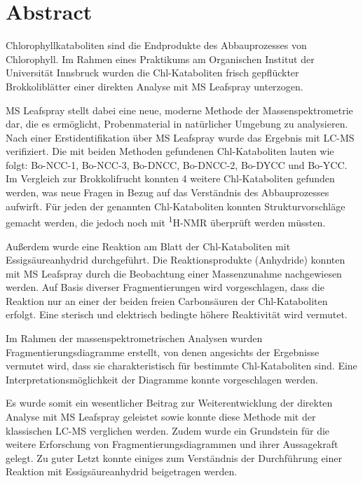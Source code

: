 

\chapter*{Abstract}
\label{cha:abstract}

Chlorophyllkataboliten sind die Endprodukte des Abbauprozesses von Chlorophyll. Im Rahmen eines Praktikums am Organischen Institut der Universität Innsbruck wurden die Chl-Kataboliten frisch gepflückter Brokkoliblätter einer direkten Analyse mit MS Leafspray unterzogen. 

MS Leafspray stellt dabei eine neue, moderne Methode der Massenspektrometrie dar, die es ermöglicht, Probenmaterial in natürlicher Umgebung zu analysieren. Nach einer Erstidentifikation über MS Leafspray wurde das Ergebnis mit LC-MS verifiziert. Die mit beiden Methoden gefundenen Chl-Kataboliten lauten wie folgt: Bo-NCC-1, Bo-NCC-3, Bo-DNCC, Bo-DNCC-2, Bo-DYCC und Bo-YCC. Im Vergleich zur Brokkolifrucht konnten 4 weitere Chl-Kataboliten gefunden werden, was neue Fragen in Bezug auf das Verständnis des Abbauprozesses aufwirft. Für jeden der genannten Chl-Kataboliten konnten Strukturvorschläge gemacht werden, die jedoch noch mit \textsuperscript{1}H-NMR überprüft werden müssten.

Außerdem wurde eine Reaktion am Blatt der Chl-Kataboliten mit Essigsäureanhydrid durchgeführt. Die Reaktionsprodukte (Anhydride) konnten mit MS Leafspray durch die Beobachtung einer Massenzunahme nachgewiesen werden. Auf Basis diverser Fragmentierungen wird vorgeschlagen, dass die Reaktion nur an einer der beiden freien Carbonsäuren der Chl-Kataboliten erfolgt. Eine sterisch und elektrisch bedingte höhere Reaktivität wird vermutet. 

Im Rahmen der massenspektrometrischen Analysen wurden Fragmentierungsdiagramme erstellt, von denen angesichts der Ergebnisse vermutet wird, dass sie charakteristisch für bestimmte Chl-Kataboliten sind. Eine Interpretationsmöglichkeit der Diagramme konnte vorgeschlagen werden. 

Es wurde somit ein wesentlicher Beitrag zur Weiterentwicklung der direkten Analyse mit MS Leafspray geleistet sowie konnte diese Methode mit der klassischen LC-MS verglichen werden. Zudem wurde ein Grundstein für die weitere Erforschung von Fragmentierungsdiagrammen und ihrer Aussagekraft gelegt. Zu guter Letzt konnte einiges zum Verständnis der Durchführung einer Reaktion mit Essigsäureanhydrid beigetragen werden.



